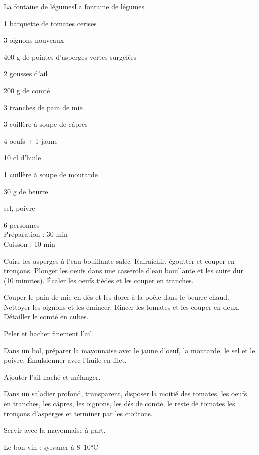 \begin{recette}{La fontaine de légumes}{La fontaine de légumes}

\begin{ingredients}
1 barquette de tomates cerises\par
3 oignons nouveaux\par
400 g de pointes d'asperges vertes surgelées\par
2 gousses d'ail\par
200 g de comté\par
3 tranches de pain de mie\par
3 cuillère à soupe de câpres\par
4 oeufs + 1 jaune\par
10 cl d'huile\par
1 cuillère à soupe de moutarde\par
30 g de beurre\par
sel, poivre\par
\end{ingredients}

\begin{infos}
6 personnes\\
Préparation : 30 min\\
Cuisson : 10 min\\
\end{infos}

\begin{etapes}
\item Cuire les asperges à l'eau bouillante salée. Rafraîchir, égoutter et couper en tronçons. Plonger les oeufs dans une casserole d'eau bouillante et les cuire dur (10 minutes). Écaler les oeufs tièdes et les couper en tranches.
\item Couper le pain de mie en dés et les dorer à la poêle dans le beurre chaud. Nettoyer les oignons et les émincer. Rincer les tomates et les couper en deux. Détailler le comté en cubes.
\item Peler et hacher finement l'ail.
\item Dans un bol, préparer la mayonnaise avec le jaune d'oeuf, la moutarde, le sel et le poivre. Émulsionner avec l'huile en filet.
\item Ajouter l'ail haché et mélanger.
\item Dans un saladier profond, transparent, disposer la moitié des tomates, les oeufs en tranches, les câpres, les oignons, les dés de comté, le reste de tomates les tronçons d'asperges et terminer par les croûtons.
\item Servir avec la mayonnaise à part.
\end{etapes}

\begin{conseils}
Le bon vin : sylvaner à 8--10°C
	
\end{conseils}

\end{recette}